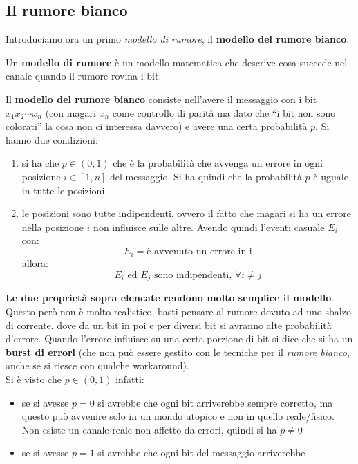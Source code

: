 \documentclass[a4paper,12pt, oneside]{book}
\begin{document}
\subsection{Il rumore bianco}
Introduciamo ora un primo \textit{modello di rumore}, il \textbf{modello del
  rumore bianco}.
\begin{definizione}
  Un \textbf{modello di rumore} è un modello matematica che descrive cosa
  succede nel canale quando il rumore rovina i bit.
\end{definizione}
\begin{definizione}
  Il \textbf{modello del rumore bianco} consiste nell'avere il messaggio con i
  bit $x_1x_2\cdots x_n$ (con magari $x_n$ come controllo di parità ma dato che
  ``i bit non sono colorati'' la cosa non ci interessa davvero) e avere una
  certa probabilità $p$. Si hanno due condizioni:
  \begin{enumerate}
    \item si ha che $p\in(0,1)$ che è la probabilità che avvenga
    un errore in ogni posizione $i\in [1,n]$ del messaggio. Si ha quindi che la
    probabilità $p$ è uguale in tutte le posizioni
    \item le posizioni sono tutte indipendenti, ovvero il fatto che magari si ha
    un errore nella posizione $i$ non influisce sulle altre. Avendo quindi
    l'eventi casuale $E_i$ con:
    \[E_i=\mbox{è avvenuto un errore in i}\]
    allora:
    \[E_i\mbox{ ed }E_j \mbox{ sono indipendenti, }\forall i\neq j\]
  \end{enumerate}
  \textbf{Le due proprietà sopra elencate rendono molto semplice il modello}.\\
  Questo però non è molto realistico, basti pensare al rumore dovuto ad uno
  sbalzo di corrente, dove da un bit in poi e per diversi bit si avranno alte
  probabilità d'errore. Quando l'errore influisce su una certa porzione di bit
  si dice che si ha un \textbf{burst di errori} (che non può essere gestito con
  le tecniche per il \textit{rumore bianco}, anche se si riesce con qualche
  workaround).\\
  Si è visto che $p\in(0,1)$ infatti:
  \begin{itemize}
    \item se si avesse $p=0$ si avrebbe che ogni bit arriverebbe sempre
    corretto, ma questo può avvenire solo in un mondo utopico e non in quello
    reale/fisico. Non esiste un canale reale non affetto da errori, quindi si ha
    $p\neq 0$
    \item se si avesse $p=1$ si avrebbe che ogni bit del messaggio arriverebbe

\end{itemize}
\end{definizione}
\end{document}
